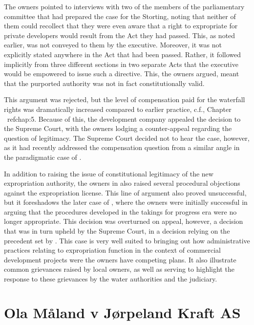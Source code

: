 The owners pointed to interviews with two of the members of the parliamentary committee that had prepared the case for the Storting, noting that neither of them could recollect that they were even aware that a right to expropriate for private developers would result from the Act they had passed. This, as noted earlier, was not conveyed to them by the executive. Moreover, it was not explicitly stated anywhere in the Act that had been passed. Rather, it followed implicitly from three different sections in two separate Acts that the executive would be empowered to issue such a directive. This, the owners argued, meant that the purported authority was not in fact constitutionally valid.

This argument was rejected, but the level of compensation paid for the waterfall rights was dramatically increased compared to earlier practice, c.f., Chapter \ ref{chap:5}. Because of this, the development company appealed the decision to the Supreme Court, with the owners lodging a counter-appeal regarding the question of legitimacy. The Supreme Court decided not to hear the case, however, as it had recently addressed the compensation question from a similar angle in the paradigmatic case of \cite{møllen08}.

In addition to raising the issue of constitutional legitimacy of the new expropriation authority, the owners in \cite{sauda08} also raised several procedural objections against the expropriation license. This line of argument also proved unsuccessful, but it foreshadows the later case of \cite{måland13}, where the owners were initially successful in arguing that the procedures developed in the takings for progress era were no longer appropriate. This decision was overturned on appeal, however, a decision that was in turn upheld by the Supreme Court, in a decision relying on the precedent set by \cite{alta82}. This case is very well suited to bringing out how administrative practices relating to expropriation function in the context of commercial development projects were the owners have competing plans. It also illustrate common grievances raised by local owners, as well as serving to highlight the response to these grievances by the water authorities and the judiciary.

\section{Ola Måland v Jørpeland Kraft AS}


